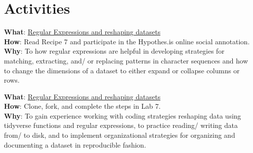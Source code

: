 \documentclass[
  letterpaper,
]{latex/krantz}
\begin{document}
\hypertarget{activities-5}{%
\section*{Activities}\label{activities-5}}


\begin{tcolorbox}[enhanced jigsaw, toprule=.15mm, bottomtitle=1mm, coltitle=black, title=\textcolor{quarto-callout-tip-color}{\faLightbulb}\hspace{0.5em}{Recipe}, left=2mm, colframe=quarto-callout-tip-color-frame, bottomrule=.15mm, colbacktitle=quarto-callout-tip-color!10!white, leftrule=.75mm, colback=white, titlerule=0mm, breakable, toptitle=1mm, opacityback=0, arc=.35mm, rightrule=.15mm, opacitybacktitle=0.6]

\textbf{What}:
\href{https://lin380.github.io/tadr/articles/recipe_7.html}{Regular
Expressions and reshaping datasets}\\
\textbf{How}: Read Recipe 7 and participate in the Hypothes.is online
social annotation.\\
\textbf{Why}: To how regular expressions are helpful in developing
strategies for matching, extracting, and/ or replacing patterns in
character sequences and how to change the dimensions of a dataset to
either expand or collapse columns or rows.

\end{tcolorbox}

\begin{tcolorbox}[enhanced jigsaw, toprule=.15mm, bottomtitle=1mm, coltitle=black, title=\textcolor{quarto-callout-tip-color}{\faLightbulb}\hspace{0.5em}{Lab}, left=2mm, colframe=quarto-callout-tip-color-frame, bottomrule=.15mm, colbacktitle=quarto-callout-tip-color!10!white, leftrule=.75mm, colback=white, titlerule=0mm, breakable, toptitle=1mm, opacityback=0, arc=.35mm, rightrule=.15mm, opacitybacktitle=0.6]

\textbf{What}: \href{https://github.com/lin380/lab_7}{Regular
Expressions and reshaping datasets}\\
\textbf{How}: Clone, fork, and complete the steps in Lab 7.\\
\textbf{Why}: To gain experience working with coding strategies
reshaping data using tidyverse functions and regular expressions, to
practice reading/ writing data from/ to disk, and to implement
organizational strategies for organizing and documenting a dataset in
reproducible fashion.

\end{tcolorbox}
\end{document}

